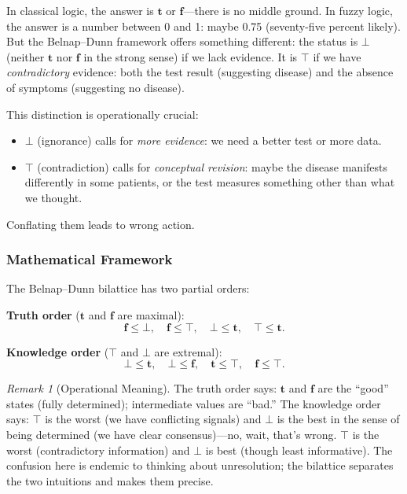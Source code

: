 \documentclass[11pt,letterpaper]{article}
\theoremstyle{definition}
\theoremstyle{remark}
\newtheorem{remark}{Remark}[section]
\begin{document}
In classical logic, the answer is $\mathbf{t}$ or $\mathbf{f}$---there is no middle ground. In fuzzy logic, the answer is a number between 0 and 1: maybe 0.75 (seventy-five percent likely). But the Belnap--Dunn framework offers something different: the status is $\bot$ (neither $\mathbf{t}$ nor $\mathbf{f}$ in the strong sense) if we lack evidence. It is $\top$ if we have \emph{contradictory} evidence: both the test result (suggesting disease) and the absence of symptoms (suggesting no disease).

This distinction is operationally crucial:
\begin{itemize}
\item $\bot$ (ignorance) calls for \emph{more evidence}: we need a better test or more data.
\item $\top$ (contradiction) calls for \emph{conceptual revision}: maybe the disease manifests differently in some patients, or the test measures something other than what we thought.
\end{itemize}

Conflating them leads to wrong action.

\subsubsection*{Mathematical Framework}

The Belnap--Dunn bilattice has two partial orders:

\textbf{Truth order} ($\mathbf{t}$ and $\mathbf{f}$ are maximal):
\[
\mathbf{f} \leq \bot, \quad \mathbf{f} \leq \top, \quad \bot \leq \mathbf{t}, \quad \top \leq \mathbf{t}.
\]

\textbf{Knowledge order} ($\top$ and $\bot$ are extremal):
\[
\bot \leq \mathbf{t}, \quad \bot \leq \mathbf{f}, \quad \mathbf{t} \leq \top, \quad \mathbf{f} \leq \top.
\]

\begin{remark}[Operational Meaning]
The truth order says: $\mathbf{t}$ and $\mathbf{f}$ are the ``good'' states (fully determined); intermediate values are ``bad.'' The knowledge order says: $\top$ is the worst (we have conflicting signals) and $\bot$ is the best in the sense of being determined (we have clear consensus)---no, wait, that's wrong. $\top$ is the worst (contradictory information) and $\bot$ is best (though least informative). The confusion here is endemic to thinking about unresolution; the bilattice separates the two intuitions and makes them precise.
\end{remark}
\end{document}
